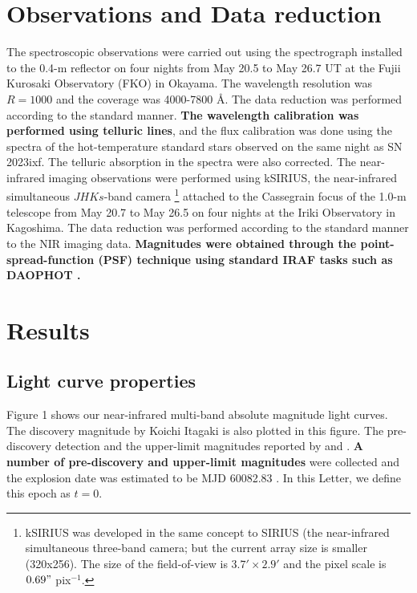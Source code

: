 \documentclass{pasj01}
\begin{document}
\section{Observations and Data reduction}
 The spectroscopic observations were carried out using
the spectrograph installed to the 0.4-m reflector on four
nights from May 20.5 to May 26.7 UT at the 
Fujii Kurosaki Observatory (FKO) in Okayama.
The wavelength resolution was $R=1000$ and 
the coverage was 4000-7800 \AA. The data reduction
was performed according to the standard manner.
{\bf The wavelength calibration was performed
using telluric lines}, and the flux calibration was done 
using the spectra of the hot-temperature standard stars
observed on the same night as SN 2023ixf. 
The telluric absorption in the spectra were also corrected.
 The near-infrared imaging observations were
performed using kSIRIUS, the near-infrared simultaneous 
$JHKs$-band camera \footnote{kSIRIUS was developed in 
the same concept to SIRIUS (the near-infrared
simultaneous three-band camera; \citep{Nagayama2003} but the current array size is smaller (320x256). The size of the field-of-view is $3.7'\times2.9'$
and the pixel scale is $0.69"$ pix$^{-1}$.} 
attached to the Cassegrain focus of the 1.0-m telescope from
May 20.7 to May 26.5 on four nights at the Iriki 
Observatory in Kagoshima. The data reduction
was performed according to the standard manner to
the NIR imaging data. 
{\bf Magnitudes were obtained through the 
point-spread-function (PSF) technique 
using standard IRAF tasks such as DAOPHOT \citep{Stetson1987} .}



\section{Results}
 \subsection{Light curve properties}

 Figure 1 shows our near-infrared multi-band absolute magnitude
light curves. The discovery magnitude by Koichi 
Itagaki \citep{Itagaki2023ixf}
is also plotted in this figure. 
The pre-discovery detection and the upper-limit magnitudes reported by \citet{Limeburner2023} and \citet{Perley2023b}.
{\bf A number of pre-discovery and upper-limit magnitudes} were 
collected and the explosion date was estimated to be 
MJD 60082.83 \citep{Yaron2023}. 
In this Letter, we define this epoch as $t=0$.
\end{document}
